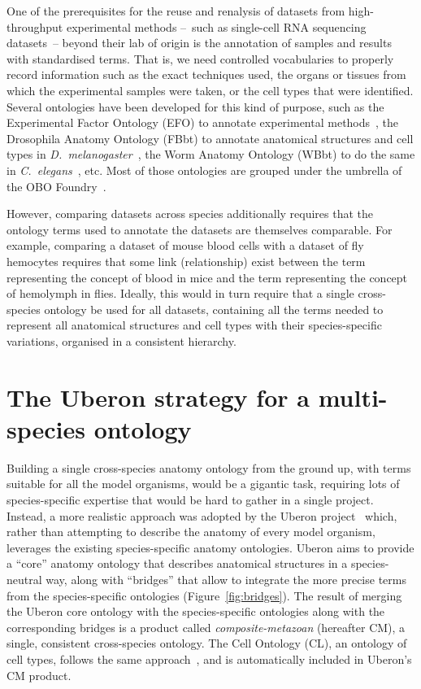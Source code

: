 \documentclass{ceurart}
\def\species#1{\textit{#1}}
\begin{document}
One of the prerequisites for the reuse and renalysis of datasets from
high-throughput experimental methods --~such as single-cell RNA sequencing
datasets~-- beyond their lab of origin is the annotation of samples
and results with standardised terms. That is, we need controlled
vocabularies to properly record information such as the exact
techniques used, the organs or tissues from which the experimental
samples were taken, or the cell types that were identified. Several
ontologies have been developed for this kind of purpose, such as the
Experimental Factor Ontology (EFO) to annotate experimental
methods~\cite{malone2010}, the Drosophila Anatomy Ontology (FBbt) to
annotate anatomical structures and cell types in
\species{D.~melanogaster}~\cite{costa2013}, the Worm Anatomy Ontology
(WBbt) to do the same in \species{C.~elegans}~\cite{lee2003}, etc. Most
of those ontologies are grouped under the umbrella of the OBO
Foundry~\cite{jackson2021}.

However, comparing datasets across species additionally requires that
the ontology terms used to annotate the datasets are themselves
comparable. For example, comparing a dataset of mouse blood cells with a
dataset of fly hemocytes requires that some link (relationship) exist
between the term representing the concept of blood in mice and the term
representing the concept of hemolymph in flies. Ideally, this would in
turn require that a single cross-species ontology be used for all
datasets, containing all the terms needed to represent all anatomical
structures and cell types with their species-specific variations,
organised in a consistent hierarchy.

\section{The Uberon strategy for a multi-species ontology}

Building a single cross-species anatomy ontology from the ground up, with terms
suitable for all the model organisms, would be a gigantic task, requiring lots
of species-specific expertise that would be hard to gather in a single project.
Instead, a more realistic approach was adopted by the Uberon
project~\cite{mungall2012a} which, rather than attempting to describe the
anatomy of every model organism, leverages the existing species-specific
anatomy ontologies. Uberon aims to provide a ``core'' anatomy ontology that
describes anatomical structures in a species-neutral way, along with
``bridges'' that allow to integrate the more precise terms from the
species-specific ontologies (Figure~\ref{fig:bridges}). The result of merging
the Uberon core ontology with the species-specific ontologies along with the
corresponding bridges is a product called \emph{composite-metazoan} (hereafter
CM), a single, consistent cross-species ontology. The Cell Ontology (CL), an
ontology of cell types, follows the same approach~\cite{diehl2016}, and is
automatically included in Uberon's CM product.
\end{document}
